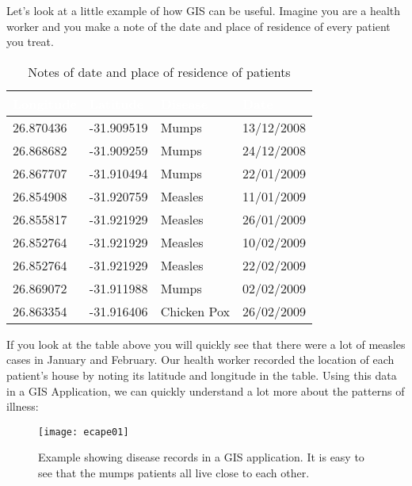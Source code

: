 Let's look at a little example of how GIS can be useful. Imagine you are a
health worker and you make a note of the date and place of residence of every
patient you treat.

\begin{table}[ht]
\centering
\caption{Notes of date and place of residence of patients}\medskip
 \label{tab:diseases}
 \begin{tabular}{|p{3cm}|p{3cm}|p{3cm}|p{3cm}|}
 \hline 
 \rowcolor{black}
 \textcolor{white}{\textbf{Longitude}} &
 \textcolor{white}{\textbf{Latitude}} & 
 \textcolor{white}{\textbf{Disease}} &
 \textcolor{white}{\textbf{Date}} \\
 \hline 26.870436 & -31.909519 & Mumps & 13/12/2008 \\
 \hline 26.868682 & -31.909259 & Mumps & 24/12/2008 \\
 \hline 26.867707 & -31.910494 & Mumps & 22/01/2009 \\
 \hline 26.854908 & -31.920759 & Measles & 11/01/2009 \\
 \hline 26.855817 & -31.921929 & Measles & 26/01/2009 \\
 \hline 26.852764 & -31.921929 & Measles & 10/02/2009 \\
 \hline 26.852764 & -31.921929 & Measles & 22/02/2009 \\
 \hline 26.869072 & -31.911988 & Mumps & 02/02/2009 \\
 \hline 26.863354 & -31.916406 & Chicken Pox & 26/02/2009 \\
\hline
\end{tabular}
\end{table}

If you look at the table above you will quickly see that there were a lot of
measles cases in January and February. Our health worker recorded the
location of each patient's house by noting its latitude and longitude in the
table. Using this data in a GIS Application,  we can quickly understand a lot
more about the patterns of illness:

\begin{figure}[ht]
   \begin{center}
   \caption{Example showing disease records in a GIS application. It is easy
    to see that the mumps patients all live close to each other.}
\label{fig:disease_records}\smallskip
   \texttt{[image: ecape01]}
\end{center}
\end{figure}

